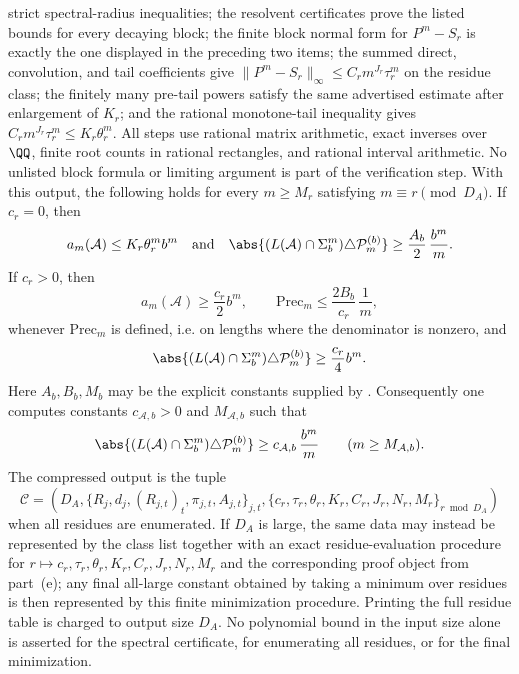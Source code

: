 \begin{theorem}
  strict spectral-radius inequalities; the resolvent certificates prove
  the listed bounds for every decaying block; the finite block normal
  form for \(P^m-S_r\) is exactly the one displayed in the preceding
  two items; the summed direct, convolution, and tail coefficients give
  \(\|P^m-S_r\|_\infty\le C_rm^{J_r}\tau_r^m\) on the residue class;
  the finitely many pre-tail powers satisfy the same advertised
  estimate after enlargement of \(K_r\); and the rational monotone-tail
  inequality gives \(C_rm^{J_r}\tau_r^m\le K_r\theta_r^m\). All steps
  use rational matrix arithmetic, exact inverses over \(\QQ\), finite
  root counts in rational rectangles, and rational interval arithmetic.
  No unlisted block formula or limiting argument is part of the
  verification step.
  With this output, the following holds for every
  \(m\ge M_r\) satisfying \(m\equiv r\pmod {D_A}\).
  If \(c_r=0\), then
  \[
    a_m(\mathcal A)\le K_r\theta_r^m b^m
    \quad\text{and}\quad
    \abs{(L(\mathcal A)\cap\Sigma_b^m)\triangle\mathcal P_m^{(b)}}
    \ge \frac{A_b}{2}\,\frac{b^m}{m}.
  \]
  If \(c_r>0\), then
  \[
    a_m(\mathcal A)\ge \frac{c_r}{2}b^m,
    \qquad
    \mathrm{Prec}_m\le \frac{2B_b}{c_r}\,\frac1m,
  \]
  whenever \(\mathrm{Prec}_m\) is defined, i.e. on lengths where the
  denominator is nonzero, and
  \[
    \abs{(L(\mathcal A)\cap\Sigma_b^m)\triangle\mathcal P_m^{(b)}}
    \ge \frac{c_r}{4} b^m .
  \]
  Here \(A_b,B_b,M_b\) may be the explicit constants supplied by
  . Consequently
  one computes constants \(c_{\mathcal A,b}>0\) and \(M_{\mathcal A,b}\)
  such that
  \[
    \abs{(L(\mathcal A)\cap\Sigma_b^m)\triangle\mathcal P_m^{(b)}}
    \ge c_{\mathcal A,b}\,\frac{b^m}{m}
    \qquad(m\ge M_{\mathcal A,b}).
  \]
  The compressed output is the tuple
  \[
    \mathcal C=(D_A,\{R_j,d_j,(R_{j,t})_t,\pi_{j,t},A_{j,t}\}_{j,t},
      \{c_r,\tau_r,\theta_r,K_r,C_r,J_r,N_r,M_r\}_{r\bmod D_A})
  \]
  when all residues are enumerated. If \(D_A\) is large, the same data
  may instead be represented by the class list together with an exact
  residue-evaluation procedure for
  \(r\mapsto c_r,\tau_r,\theta_r,K_r,C_r,J_r,N_r,M_r\) and the
  corresponding proof object from part~\textup{(e)};
  any final all-large constant obtained by taking a minimum over
  residues is then represented by this finite minimization procedure.
  Printing the full residue table is charged to output size \(D_A\).
  No polynomial bound in the input size alone is asserted for the
  spectral certificate, for enumerating all residues, or for the final
  minimization.
\end{theorem}

